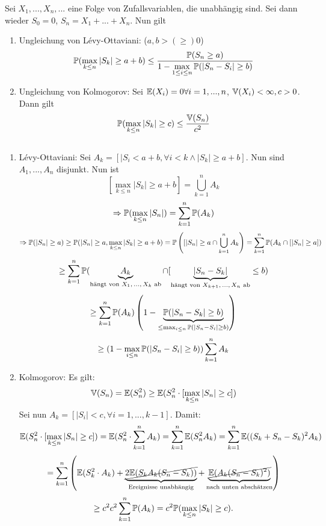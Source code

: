 			\begin{satz}[Maximalungleichungen]
				Sei $X_1,...,X_n,...$ eine Folge von Zufallsvariablen, die unabhängig sind. Sei dann wieder $S_0=0$, $S_n=X_1+...+X_n$. Nun gilt
				\begin{enumerate}
					\item Ungleichung von Lévy-Ottaviani: ($a,b>(\ge)0$)				
					\[ \P(\max_{k\le n}|S_k|\ge a+b)\le\frac{\P(S_n\ge a)}{1-\max\limits_{1\le i\le n}\P(|S_n-S_i|\ge b)} \] 
					\item Ungleichung von Kolmogorov: Sei $\E(X_i)=0\forall i=1,...,n$, $\V(X_i)<\infty, c>0$. Dann gilt
					\[ \P(\max_{k\le n}|S_k|\ge c)\le\frac{\V(S_n)}{c^2} \]
				\end{enumerate}
			\end{satz}
			
			\begin{bew} $ $
				\begin{enumerate}
					\item Lévy-Ottaviani:\newline
						Sei $A_k=[|S_i<a+b, \forall i<k\land |S_k|\ge a+b]$. Nun sind $A_1,...,A_n$ disjunkt. Nun ist
						\[ [\max\limits_{k\le n}|S_k|\ge a+b]=\bigcup_{k=1}^n A_k \]
						\[ \Rightarrow \P(\max_{k\le n} |S_n|)=\sum_{k=1}^n \P(A_k) \]
						\[ \Rightarrow \P(|S_n|\ge a)\ge \P(|S_n|\ge a, \max_{k\le n}|S_k|\ge a+b)=\P\left([|S_n|\ge a\cap\bigcup_{k=1}^nA_k\right)=\sum_{k=1}^{n}\P(A_k\cap[|S_n|\ge a]) \]
						\[ \ge \sum_{k=1}^n\P(\underbrace{A_k}_{\text{hängt von $X_1,...,X_k$ ab}}\cap[\underbrace{|S_n-S_k|}_{\text{hängt von $X_{k+1},...,X_n$ ab}}\le b) \]
						\[ \ge \sum_{k=1}^n\P(A_k)\left(1-\underbrace{\P(|S_n-S_k|\ge b)}_{\le \max_{i\le n}\P(|S_n-S_i|\ge b)}\right) \]
						\[ \ge (1-\max_{i\le n} \P(|S_n-S_i|\ge b))\sum_{k=1}^n A_k \]
						\arge
					\item Kolmogorov:\newline
						Es gilt:
						\[ \V(S_n)=\E(S_n^2)\ge\E(S_n^2\cdot [\max_{k\le n}|S_n|\ge c]) \]
						Sei nun $A_k=[|S_i|<c, \forall i=1,...,k-1]$. Damit:
						\[ \E(S_n^2\cdot [\max_{k\le n}|S_n|\ge c])=\E(S_n^2\cdot\sum_{k=1}^n A_k)=\sum_{k=1}^n\E(S_n^2A_k)=\sum_{k=1}^n\E((S_k+S_n-S_k)^2A_k) \]
						\[ =\sum_{k=1}^n\left(\E(S_k^2\cdot A_k)+\underbrace{\cancel{2\E(S_kA_k(S_n-S_k))}}_{\text{Ereignisse unabhängig}}+\underbrace{\cancel{\E(A_k(S_n-S_k)^2)}}_{\text{nach unten abschätzen}}\right) \]
						\[ \ge c^2 c^2\sum_{k=1}^n\P(A_k)=c^2\P(\max_{k\le n}|S_k|\ge c).  \]
				\end{enumerate}
			\end{bew}
			
